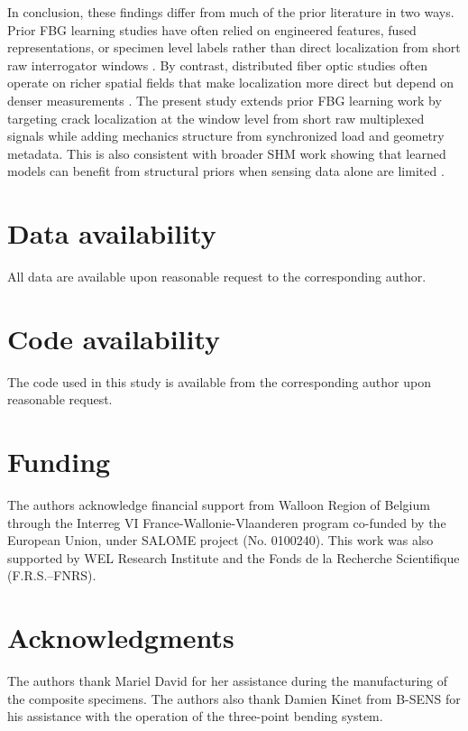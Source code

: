 \documentclass[fleqn,10pt]{wlscirep}
\begin{document}
In conclusion, these findings differ from much of the prior literature in two ways. Prior FBG learning studies have often relied on engineered features, fused representations, or specimen level labels rather than direct localization from short raw interrogator windows \cite{chilelli2019,zhang2020,wang2023,zhao2025,xiong2025,saha2025}. By contrast, distributed fiber optic studies often operate on richer spatial fields that make localization more direct but depend on denser measurements \cite{liu2023,lu2025}. The present study extends prior FBG learning work by targeting crack localization at the window level from short raw multiplexed signals while adding mechanics structure from synchronized load and geometry metadata. This is also consistent with broader SHM work showing that learned models can benefit from structural priors when sensing data alone are limited \cite{yoon2022,moreh2025,si2025}.

\section*{Data availability}

All data are available upon reasonable request to the corresponding author.

\section*{Code availability}

The code used in this study is available from the corresponding author upon reasonable request.



\section*{Funding}

The authors acknowledge financial support from Walloon Region of Belgium through the Interreg VI France-Wallonie-Vlaanderen program co-funded by the European Union, under SALOME project (No. 0100240). This work was also supported by WEL Research Institute and the Fonds de la Recherche Scientifique (F.R.S.--FNRS).

\section*{Acknowledgments}

The authors thank Mariel David for her assistance during the manufacturing of the composite specimens. The authors also thank Damien Kinet from B-SENS for his assistance with the operation of the three-point bending system.
\end{document}

